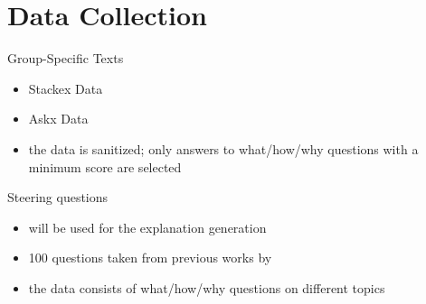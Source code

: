 \documentclass[]{beamer}
\begin{document}
\section{Data Collection}
\begin{frame}{Group-Specific Texts}
  \begin{itemize}
    \item<2-> Stackex Data
    \item<2-> Askx Data
    \item<5-> the data is sanitized; only answers to what/how/why questions with a minimum score are selected
  \end{itemize}
\end{frame}

\begin{frame}{Steering questions}
  \begin{itemize}
    \item will be used for the explanation generation
    \item 100 questions taken from previous works by \citet{petroni-etal-2021-kilt,rooeinKnowYourAudience2023}
    \item the data consists of what/how/why questions on different topics
  \end{itemize}
\end{frame}


\end{document}
